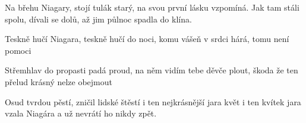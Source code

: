 
\beginverse{}
Na břehu Niagary, stojí tulák starý,
na svou první lásku vzpomíná.
Jak tam stáli spolu, dívali se dolů,
až jim půlnoc spadla do klína.
\endverse{}

\beginchorus{}
Teskně hučí Niagara, teskně hučí do noci,
\lrep{} komu vášeň v srdci hárá, tomu není pomoci \rrep{}
\endchorus{}

\beginverse{}
Střemhlav do propasti padá proud,
na něm vidím tebe děvče plout,
\lrep{} škoda že ten přelud krásný nelze obejmout \rrep{}
\endverse{}

\beginverse{}
Osud tvrdou pěstí, zničil lidské štěstí
i ten nejkrásnější jara květ
i ten kvítek jara vzala Niagára
a už nevrátí ho nikdy zpět.
\endverse{}

\beginchorus{}
\phantom{}
\endchorus{}

\endsong{}
